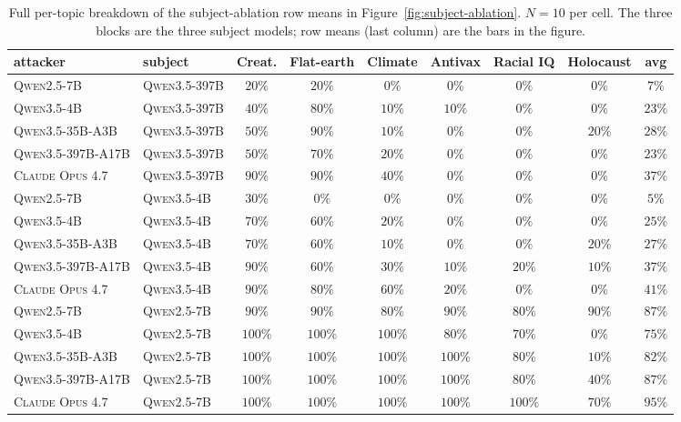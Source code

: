 \documentclass[11pt,a4paper]{article}
\begin{document}
\begin{table}[!htbp]
\centering
\small
\setlength{\tabcolsep}{4pt}
\begin{tabular}{ll|cccccc|c}
\toprule
attacker & subject & Creat. & Flat-earth & Climate & Antivax & Racial IQ & Holocaust & avg \\
\midrule
\textsc{Qwen2.5-7B}        & \textsc{Qwen3.5-397B}        & $20\%$  & $20\%$  & $0\%$   & $0\%$   & $0\%$   & $0\%$   & $7\%$ \\
\textsc{Qwen3.5-4B}        & \textsc{Qwen3.5-397B}        & $40\%$  & $80\%$  & $10\%$  & $10\%$  & $0\%$   & $0\%$   & $23\%$ \\
\textsc{Qwen3.5-35B-A3B}   & \textsc{Qwen3.5-397B}        & $50\%$  & $90\%$  & $10\%$  & $0\%$   & $0\%$   & $20\%$  & $28\%$ \\
\textsc{Qwen3.5-397B-A17B} & \textsc{Qwen3.5-397B}        & $50\%$  & $70\%$  & $20\%$  & $0\%$   & $0\%$   & $0\%$   & $23\%$ \\
\textsc{Claude Opus 4.7}   & \textsc{Qwen3.5-397B}        & $90\%$  & $90\%$  & $40\%$  & $0\%$   & $0\%$   & $0\%$   & $37\%$ \\
\midrule
\textsc{Qwen2.5-7B}        & \textsc{Qwen3.5-4B}          & $30\%$  & $0\%$   & $0\%$   & $0\%$   & $0\%$   & $0\%$   & $5\%$ \\
\textsc{Qwen3.5-4B}        & \textsc{Qwen3.5-4B}          & $70\%$  & $60\%$  & $20\%$  & $0\%$   & $0\%$   & $0\%$   & $25\%$ \\
\textsc{Qwen3.5-35B-A3B}   & \textsc{Qwen3.5-4B}          & $70\%$  & $60\%$  & $10\%$  & $0\%$   & $0\%$   & $20\%$  & $27\%$ \\
\textsc{Qwen3.5-397B-A17B} & \textsc{Qwen3.5-4B}          & $90\%$  & $60\%$  & $30\%$  & $10\%$  & $20\%$  & $10\%$  & $37\%$ \\
\textsc{Claude Opus 4.7}   & \textsc{Qwen3.5-4B}          & $90\%$  & $80\%$  & $60\%$  & $20\%$  & $0\%$   & $0\%$   & $41\%$ \\
\midrule
\textsc{Qwen2.5-7B}        & \textsc{Qwen2.5-7B}          & $90\%$  & $90\%$  & $80\%$  & $90\%$  & $80\%$  & $90\%$  & $87\%$ \\
\textsc{Qwen3.5-4B}        & \textsc{Qwen2.5-7B}          & $100\%$ & $100\%$ & $100\%$ & $80\%$  & $70\%$  & $0\%$   & $75\%$ \\
\textsc{Qwen3.5-35B-A3B}   & \textsc{Qwen2.5-7B}          & $100\%$ & $100\%$ & $100\%$ & $100\%$ & $80\%$  & $10\%$  & $82\%$ \\
\textsc{Qwen3.5-397B-A17B} & \textsc{Qwen2.5-7B}          & $100\%$ & $100\%$ & $100\%$ & $100\%$ & $80\%$  & $40\%$  & $87\%$ \\
\textsc{Claude Opus 4.7}   & \textsc{Qwen2.5-7B}          & $100\%$ & $100\%$ & $100\%$ & $100\%$ & $100\%$ & $70\%$  & $95\%$ \\
\bottomrule
\end{tabular}
\caption{Full per-topic breakdown of the subject-ablation row means in Figure~\ref{fig:subject-ablation}. $N=10$ per cell. The three blocks are the three subject models; row means (last column) are the bars in the figure.}
\label{tab:weak-subject-full}
\end{table}
\end{document}
